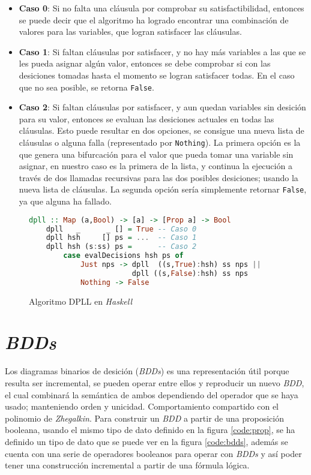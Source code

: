 \begin{itemize}
    \item \textbf{Caso 0}: Si no falta una cláusula por comprobar su satisfactibilidad, entonces se puede decir que el algoritmo ha logrado encontrar una combinación de valores para las variables, que logran satisfacer las cláusulas.
    \item \textbf{Caso 1}: Si faltan cláusulas por satisfacer, y no hay más variables a las que se les pueda asignar algún valor, entonces se debe comprobar si con las desiciones tomadas hasta el momento se logran satisfacer todas. En el caso que no sea posible, se retorna \texttt{False}.
    \item \textbf{Caso 2}: Si faltan cláusulas por satisfacer, y aun quedan variables sin desición para su valor, entonces se evaluan las desiciones actuales en todas las cláusulas. Esto puede resultar en dos opciones, se consigue una nueva lista de cláusulas o alguna falla (representado por \texttt{Nothing}). La primera opción es la que genera una bifurcación para el valor que pueda tomar una variable sin asignar, en nuestro caso es la primera de la lista, y continua la ejecución a través de dos llamadas recursivas para las dos posibles desiciones; usando la nueva lista de cláusulas. La segunda opción sería simplemente retornar \texttt{False}, ya que alguna ha fallado.
\end{itemize}

\begin{figure}
\begin{lstlisting}[language=Haskell]
    dpll :: Map (a,Bool) -> [a] -> [Prop a] -> Bool
    dpll   _      _ [] = True -- Caso 0
    dpll hsh     [] ps = ...  -- Caso 1
    dpll hsh (s:ss) ps =      -- Caso 2
        case evalDecisions hsh ps of
            Just nps -> dpll  ((s,True):hsh) ss nps ||
                        dpll ((s,False):hsh) ss nps
            Nothing -> False
\end{lstlisting}
\caption{Algoritmo DPLL en \textit{Haskell}}
\label{code:dpll}
\end{figure}

\section{\textit{BDDs}}
\label{sec:bdds}

Los diagramas binarios de desición (\textit{BDDs}) es una representación útil porque resulta ser incremental, se pueden operar entre ellos y reproducir un nuevo \textit{BDD}, el cual combinará la semántica de ambos dependiendo del operador que se haya usado; manteniendo orden y unicidad. Comportamiento compartido con el polinomio de \textit{Zhegalkin}. Para construir un \textit{BDD} a partir de una proposición booleana, usando el mismo tipo de dato definido en la figura \ref{code:prop}, se ha definido un tipo de dato que se puede ver en la figura \ref{code:bdds}, además se cuenta con una serie de operadores booleanos para operar con \textit{BDDs} y así poder tener una construcción incremental a partir de una fórmula lógica.

